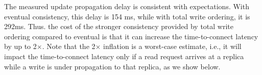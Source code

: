 The measured update propagation delay is consistent with expectations. With eventual consistency, this delay is 154 ms, while with total write ordering, it is 292ms. Thus. the cost of the stronger consistency provided by total write ordering compared to eventual is that it can increase the time-to-connect latency by up to 2$\times$. Note that the 2$\times$ inflation is a worst-case estimate, i.e., it will impact the time-to-connect latency only if a read request arrives at a replica while a write is under propagation to that replica, as we show below.









